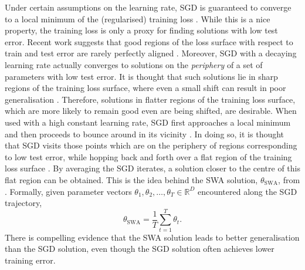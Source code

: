 \documentclass[msc,deptreport.inf]{infthesis} %
\newcommand{\R}{\mathbb R}
\begin{document}
Under certain assumptions on the learning rate, SGD is guaranteed to converge to a local minimum of the (regularised) training loss \cite{ruder2016}. While this is a nice property, the training loss is only a proxy for finding solutions with low test error. Recent work suggests that good regions of the loss surface with respect to train and test error are rarely perfectly aligned \cite{izmailov2018}. Moreover, SGD with a decaying learning rate actually converges to solutions on the \emph{periphery} of a set of parameters with low test error. It is thought that such solutions lie in sharp regions of the training loss surface, where even a small shift can result in poor generalisation \cite{izmailov2018}. Therefore, solutions in flatter regions of the training loss surface, which are more likely to remain good even are being shifted, are desirable. When used with a high constant learning rate, SGD first approaches a local minimum and then proceeds to bounce around in its vicinity \cite{mandt2017}. In doing so, it is thought that SGD visits those points which are on the periphery of regions corresponding to low test error, while hopping back and forth over a flat region of the training loss surface \cite{izmailov2018}. By averaging the SGD iterates, a solution closer to the centre of this flat region can be obtained. This is the idea behind the SWA solution, $\theta_{\text{SWA}}$, from \cite{izmailov2018}. Formally, given parameter vectors $\theta_1, \theta_2, \dots, \theta_T \in \R^D$ encountered along the SGD trajectory,
\begin{equation}\label{eqn:swa_solution}
	\theta_{\text{SWA}} = \frac{1}{T}\sum_{t=1}^T \theta_t.
\end{equation}
There is compelling evidence that the SWA solution leads to better generalisation than the SGD solution, even though the SGD solution often achieves lower training error. 
\end{document}
